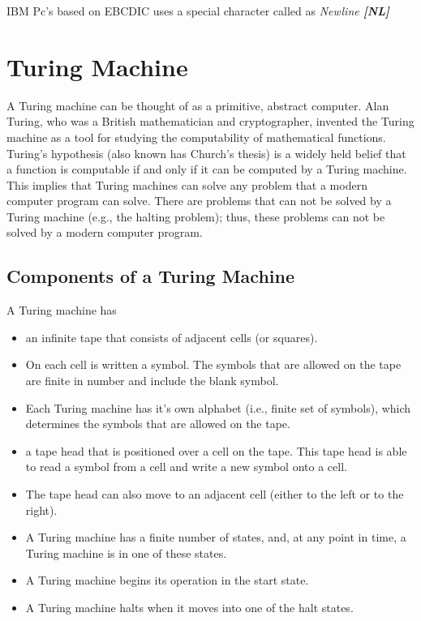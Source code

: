 \documentclass[12pt]{article}
\begin{document}
IBM Pc's based on EBCDIC uses a special character called as \textit{Newline \textbf{[NL]}}
\pagebreak

\section{Turing Machine}

A Turing machine can be thought of as a primitive, abstract computer. Alan Turing, who was a British mathematician and cryptographer, invented the Turing machine as a tool for studying the computability of mathematical functions. Turing's hypothesis (also known has Church's thesis) is a widely held belief that a function is computable if and only if it can be computed by a Turing machine. This implies that Turing machines can solve any problem that a modern computer program can solve. There are problems that can not be solved by a Turing machine (e.g., the halting problem); thus, these problems can not be solved by a modern computer program.

\subsection{Components of a Turing Machine}
A Turing machine has
\begin{itemize}
\item an infinite tape that consists of adjacent cells (or squares). 
\item On each cell is written a symbol. The symbols that are allowed on the tape are finite in number and include the blank symbol. 
\item Each Turing machine has it's own alphabet (i.e., finite set of symbols), which determines the symbols that are allowed on the tape.
\item a tape head that is positioned over a cell on the tape. This tape head is able to read a symbol from a cell and write a new symbol onto a cell. 
\item The tape head can also move to an adjacent cell (either to the left or to the right).
\item A Turing machine has a finite number of states, and, at any point in time, a Turing machine is in one of these states. 
\item A Turing machine begins its operation in the start state. 
\item A Turing machine halts when it moves into one of the halt states.
\end{itemize} 
\pagebreak
\end{document}
